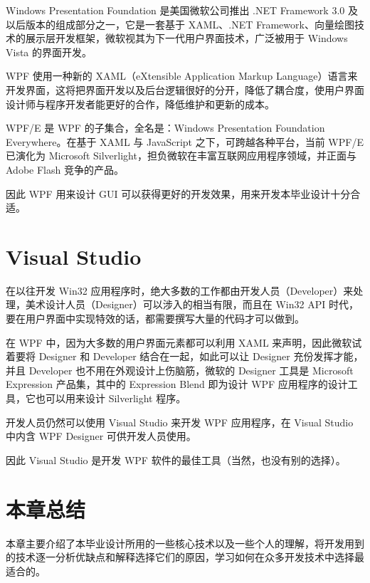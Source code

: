 Windows Presentation Foundation 是美国微软公司推出 .NET Framework 3.0 及以后版本的组成部分之一，它是一套基于 XAML、.NET Framework、向量绘图技术的展示层开发框架，微软视其为下一代用户界面技术，广泛被用于 Windows Vista 的界面开发。

WPF 使用一种新的 XAML（eXtensible Application Markup Language）语言来开发界面，这将把界面开发以及后台逻辑很好的分开，降低了耦合度，使用户界面设计师与程序开发者能更好的合作，降低维护和更新的成本。

WPF/E 是 WPF 的子集合，全名是：Windows Presentation Foundation Everywhere。在基于 XAML 与 JavaScript 之下，可跨越各种平台，当前 WPF/E 已演化为 Microsoft Silverlight，担负微软在丰富互联网应用程序领域，并正面与 Adobe Flash 竞争的产品。

因此 WPF 用来设计 GUI 可以获得更好的开发效果，用来开发本毕业设计十分合适。

\section{Visual Studio}

在以往开发 Win32 应用程序时，绝大多数的工作都由开发人员（Developer）来处理，美术设计人员（Designer）可以涉入的相当有限，而且在 Win32 API 时代，要在用户界面中实现特效的话，都需要撰写大量的代码才可以做到。

在 WPF 中，因为大多数的用户界面元素都可以利用 XAML 来声明，因此微软试着要将 Designer 和 Developer 结合在一起，如此可以让 Designer 充份发挥才能，并且 Developer 也不用在外观设计上伤脑筋，微软的 Designer 工具是 Microsoft Expression 产品集，其中的 Expression Blend 即为设计 WPF 应用程序的设计工具，它也可以用来设计 Silverlight 程序。

开发人员仍然可以使用 Visual Studio 来开发 WPF 应用程序，在 Visual Studio 中内含 WPF Designer 可供开发人员使用。

因此 Visual Studio 是开发 WPF 软件的最佳工具（当然，也没有别的选择）。

\section{本章总结}

本章主要介绍了本毕业设计所用的一些核心技术以及一些个人的理解，将开发用到的技术逐一分析优缺点和解释选择它们的原因，学习如何在众多开发技术中选择最适合的。

